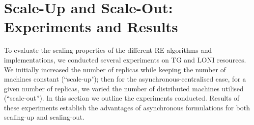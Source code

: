 \documentclass{rspublic}
\newcommand{\jhanote}[1]{ {\textcolor{red} { ***shantenu: #1 }}}
\newcommand{\alnote}[1]{ {\textcolor{blue} { ***andre: #1 }}}
\newcommand{\alnote}[1]{}
\newcommand{\jhanote}[1]{}
\begin{document}

\section{Scale-Up and Scale-Out: Experiments and Results}
\label{sec:performance}

To evaluate the scaling properties of the different RE algorithms and
implementations, we conducted several experiments on TG and LONI
resources. We initially increased the number of replicas while keeping
the number of machines constant (``scale-up"); then for the
asynchronous-centralised case, for a given number of replicas, we
varied the number of distributed machines utilised (``scale-out''). In
this section we outline the experiments conducted. Results of these
experiments establish the advantages of asynchronous formulations for
both scaling-up and scaling-out.

\end{document}
